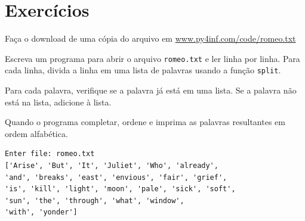 \section{Exercícios}

\begin{ex}
Faça o download de uma cópia do arquivo em
\url{www.py4inf.com/code/romeo.txt}

Escreva um programa para abrir o arquivo {\tt romeo.txt}
e ler linha por linha. Para cada linha, divida a linha em uma lista
de palavras usando a função {\tt split}.

Para cada palavra, verifique se a palavra já está em uma lista.
Se a palavra não está na lista, adicione à lista.

Quando o programa completar, ordene e imprima as palavras resultantes
em ordem alfabética.

\begin{verbatim}
Enter file: romeo.txt
['Arise', 'But', 'It', 'Juliet', 'Who', 'already', 
'and', 'breaks', 'east', 'envious', 'fair', 'grief', 
'is', 'kill', 'light', 'moon', 'pale', 'sick', 'soft', 
'sun', 'the', 'through', 'what', 'window', 
'with', 'yonder']
\end{verbatim}
\end{ex}

